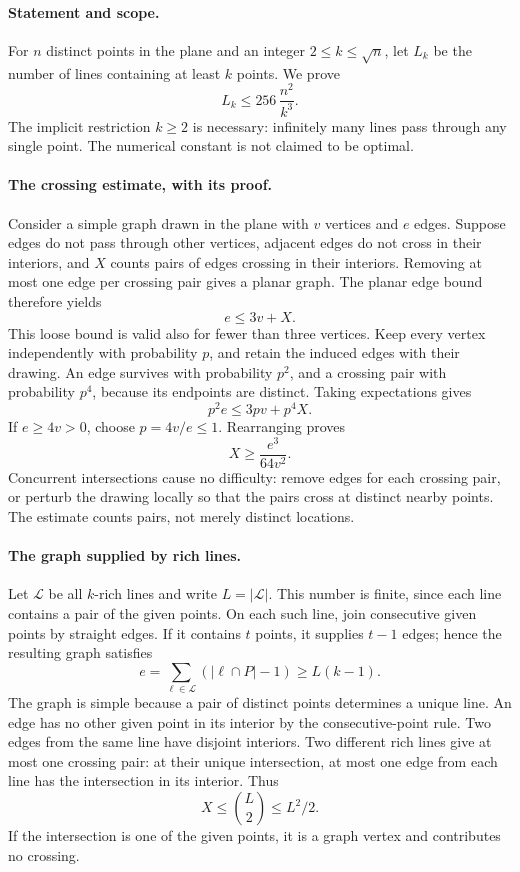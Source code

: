\paragraph{Statement and scope.}
For \(n\) distinct points in the plane and an integer \(2\leq k\leq\sqrt n\), let \(L_k\) be the number of lines containing at least \(k\) points. We prove
\[
 L_k\leq256\,\frac{n^2}{k^3}.
\]
The implicit restriction \(k\geq2\) is necessary: infinitely many lines pass through any single point. The numerical constant is not claimed to be optimal.

\paragraph{The crossing estimate, with its proof.}
Consider a simple graph drawn in the plane with \(v\) vertices and \(e\) edges. Suppose edges do not pass through other vertices, adjacent edges do not cross in their interiors, and \(X\) counts pairs of edges crossing in their interiors. Removing at most one edge per crossing pair gives a planar graph. The planar edge bound therefore yields
\[
 e\leq3v+X.
\]
This loose bound is valid also for fewer than three vertices. Keep every vertex independently with probability \(p\), and retain the induced edges with their drawing. An edge survives with probability \(p^2\), and a crossing pair with probability \(p^4\), because its endpoints are distinct. Taking expectations gives
\[
 p^2e\leq3pv+p^4X.
\]
If \(e\geq4v>0\), choose \(p=4v/e\leq1\). Rearranging proves
\[
 X\geq\frac{e^3}{64v^2}. \tag{1}
\]
Concurrent intersections cause no difficulty: remove edges for each crossing pair, or perturb the drawing locally so that the pairs cross at distinct nearby points. The estimate counts pairs, not merely distinct locations.

\paragraph{The graph supplied by rich lines.}
Let \(\mathcal L\) be all \(k\)-rich lines and write \(L=|\mathcal L|\). This number is finite, since each line contains a pair of the given points. On each such line, join consecutive given points by straight edges. If it contains \(t\) points, it supplies \(t-1\) edges; hence the resulting graph satisfies
\[
 e=\sum_{\ell\in\mathcal L}(|\ell\cap P|-1)\geq L(k-1).
\]
The graph is simple because a pair of distinct points determines a unique line. An edge has no other given point in its interior by the consecutive-point rule. Two edges from the same line have disjoint interiors. Two different rich lines give at most one crossing pair: at their unique intersection, at most one edge from each line has the intersection in its interior. Thus
\[
 X\leq\binom L2\leq L^2/2. \tag{2}
\]
If the intersection is one of the given points, it is a graph vertex and contributes no crossing.

